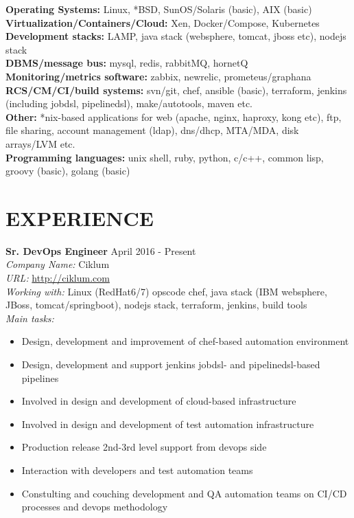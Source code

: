\documentclass[mymargin,10pt]{res} %
\begin{document}
\begin{resume}
{\bf Operating Systems:} Linux, *BSD, SunOS/Solaris (basic), AIX (basic) \\
{\bf Virtualization/Containers/Cloud:} Xen, Docker/Compose, Kubernetes \\
{\bf Development stacks:} LAMP, java stack (websphere, tomcat, jboss etc), nodejs stack \\
{\bf DBMS/message bus:} mysql, redis, rabbitMQ, hornetQ \\
{\bf Monitoring/metrics software:}  zabbix, newrelic, prometeus/graphana \\
{\bf RCS/CM/CI/build systems:} svn/git, chef, ansible (basic), terraform, jenkins (including jobdsl, pipelinedsl), make/autotools, maven etc. \\
{\bf Other:} *nix-based applications for web (apache, nginx, haproxy, kong etc), ftp, file sharing, account management (ldap), dns/dhcp, MTA/MDA, disk arrays/LVM etc. \\
{\bf Programming languages:} unix shell, ruby, python, c/c++, common lisp, groovy (basic), golang (basic) \\


\section{EXPERIENCE}

{\bf Sr. DevOps Engineer} \hfill April 2016 - Present \\
{\sl Company Name:} Ciklum \\
{\sl URL:} \url{http://ciklum.com} \\
{\sl Working with:} Linux (RedHat6/7) opscode chef, java stack (IBM websphere, JBoss, tomcat/springboot), nodejs stack, terraform, jenkins, build tools \\
{\sl Main tasks:}
\begin{itemize}
\item Design, development and improvement of chef-based automation environment
\item Design, development and support jenkins jobdsl- and pipelinedsl-based pipelines
\item Involved in design and development of cloud-based infrastructure
\item Involved in design and development of test automation infrastructure
\item Production release 2nd-3rd level support from devops side
\item Interaction with developers and test automation teams
\item Constulting and couching development and QA automation teams on CI/CD processes and devops methodology
\end{itemize}


\end{resume}
\end{document}
